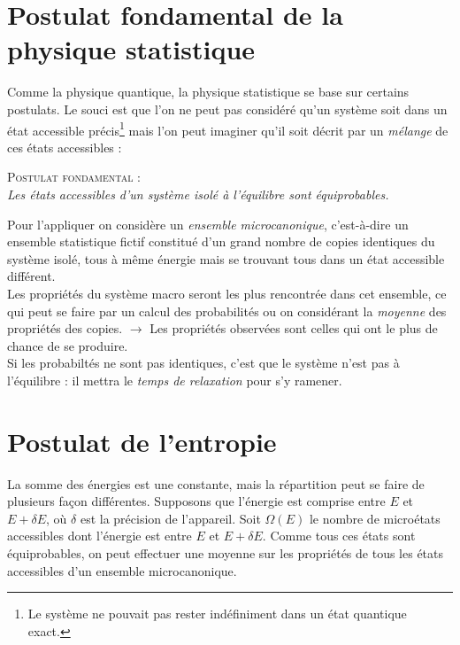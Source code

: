 \documentclass	[11pt, a4paper, openany]{book}
\begin{document}
\section{Postulat fondamental de la physique statistique}
Comme la physique quantique, la physique statistique se base sur certains postulats. Le souci est 
que l'on ne peut pas considéré qu'un système soit dans un état accessible précis\footnote{Le système
ne pouvait pas rester indéfiniment dans un état quantique exact.} mais l'on peut imaginer qu'il soit 
décrit par un \textit{mélange} de ces états accessibles :
\begin{center}
\textsc{Postulat fondamental} :\\
\textit{Les états accessibles d'un système isolé à l'équilibre sont équiprobables.}
\end{center}
Pour l'appliquer on considère un \textit{ensemble microcanonique}, c'est-à-dire un ensemble statistique
fictif constitué d'un grand nombre de copies identiques du système isolé, tous à même énergie mais se 
trouvant tous dans un état accessible différent.\\
Les propriétés du système macro seront les plus rencontrée dans cet ensemble, ce qui peut se
faire par un calcul des probabilités ou on considérant la \textit{moyenne} des propriétés des copies.
$\rightarrow$ Les propriétés observées sont celles qui ont le plus de chance de se produire.\\
Si les probabiltés ne sont pas identiques, c'est que le système n'est pas à l'équilibre : il mettra le 
\textit{temps de relaxation} pour s'y ramener.


\section{Postulat de l'entropie}
La somme des énergies est une constante, mais la répartition peut se faire de plusieurs façon 
différentes. Supposons que l'énergie est comprise entre $E$ et $E+\delta E$, où $\delta$ est la
précision de l'appareil. Soit $\Omega(E)$ le nombre de microétats accessibles dont l'énergie est
entre $E$ et $E+\delta E$. Comme tous ces états sont équiprobables, on peut effectuer une moyenne
sur les propriétés de tous les états accessibles d'un ensemble microcanonique.\\
\end{document}
